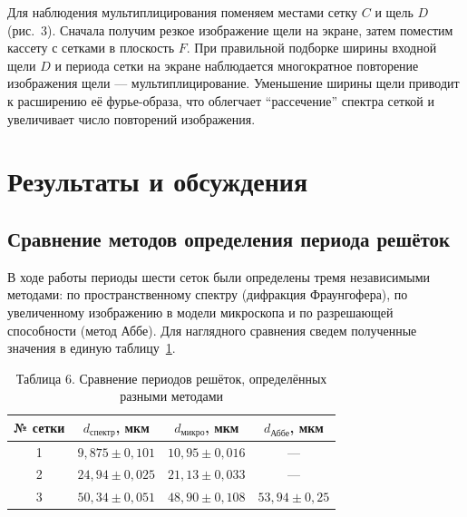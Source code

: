 \documentclass[a4paper]{article}
\begin{document}
Для наблюдения мультиплицирования поменяем местами сетку $C$ и щель $D$ (рис.~3). Сначала получим резкое изображение щели на экране, затем поместим кассету с сетками в плоскость $F$. При правильной подборке ширины входной щели $D$ и периода сетки на экране наблюдается многократное повторение изображения щели --- мультиплицирование. Уменьшение ширины щели приводит к расширению её фурье-образа, что облегчает ``рассечение'' спектра сеткой и увеличивает число повторений изображения.

\section{Результаты и обсуждения}

\subsection{Сравнение методов определения периода решёток}

В ходе работы периоды шести сеток были определены тремя независимыми методами: по пространственному спектру (дифракция Фраунгофера), по увеличенному изображению в модели микроскопа и по разрешающей способности (метод Аббе). Для наглядного сравнения сведем полученные значения в единую таблицу~\ref{tab:comparison_final}.

\begin{table}[h!]
\centering
\begin{tabular}{|c|c|c|c|}
\hline
№ сетки & $d_{\text{спектр}}$, мкм & $d_{\text{микро}}$, мкм & $d_{\text{Аббе}}$, мкм \\
\hline
1 & $9{,}875 \pm 0{,}101$ & $10{,}95 \pm 0{,}016$ & --- \\
\hline
2 & $24{,}94 \pm 0{,}025$ & $21{,}13 \pm 0{,}033$ & --- \\
\hline
3 & $50{,}34 \pm 0{,}051$ & $48{,}90 \pm 0{,}108$ & $53{,}94 \pm 0{,}25$ \\
\hline
\end{tabular}
\caption{Таблица 6. Сравнение периодов решёток, определённых разными методами}
\label{tab:comparison_final}
\end{table}
\end{document}
